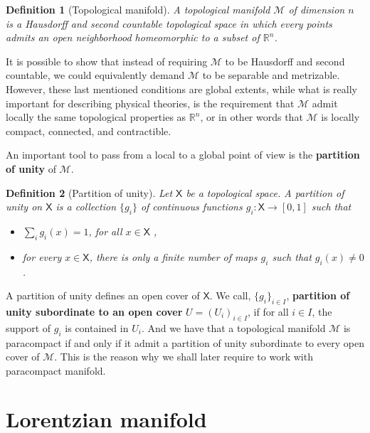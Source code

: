 \documentclass[11pt]{book}
\newcommand{\Mcal}{\mathcal{M}}
\newcommand{\Rbb}{\mathbb{R}}
\newcommand{\Xsf}{\mathsf{X}}
\theoremstyle{break}
\newtheorem{definition}{Definition}[chapter]
\begin{document}
\bigskip


\begin{definition}[Topological manifold]
A topological manifold $\Mcal$ of dimension $n$ is a Hausdorff and second countable topological space in which every points admits an open neighborhood homeomorphic to a subset of $\Rbb^n$.
\end{definition}


It is possible to show that instead of requiring $\Mcal$ to be Hausdorff and second countable, we could equivalently demand $\Mcal$ to be separable and metrizable. However, these last mentioned conditions are global extents, while what is really important for describing physical theories, is the requirement that $\Mcal$ admit locally the same topological properties as $\Rbb^n$, or in other words that  $\Mcal$ is locally compact, connected, and contractible.


An important tool to pass from a local to a global point of view is the \textbf{partition of unity} of $\Mcal$. 


\begin{definition}[Partition of unity]
Let $\Xsf$ be a topological space. A partition of unity on $\Xsf$ is a collection $\{g_i\}$ of continuous functions $g_i : \Xsf \to [0,1]$ such that
%
\begin{itemize}
\item $\sum_i g_i(x) = 1$, for all $x \in \Xsf$ ,
\item for every $x \in \Xsf$, there is only a finite number of maps $g_i$ such that $g_i(x) \neq 0$.
\end{itemize}
%
\end{definition}


A partition of unity defines an open cover of $\Xsf$. We call, $\{g_i\}_{i \in I}$, \textbf{partition of unity subordinate to an open cover} $U=(U_i)_{i \in I}$, if for all $i \in I$, the support of $g_i$ is contained in $U_i$. And we have that a topological manifold $\Mcal$ is paracompact if and only if it admit a partition of unity subordinate to every open cover of $\Mcal$. This is the reason why we shall later require to work with paracompact manifold.


\section{Lorentzian manifold}
\label{p:LORENTZ_M}
\end{document}
